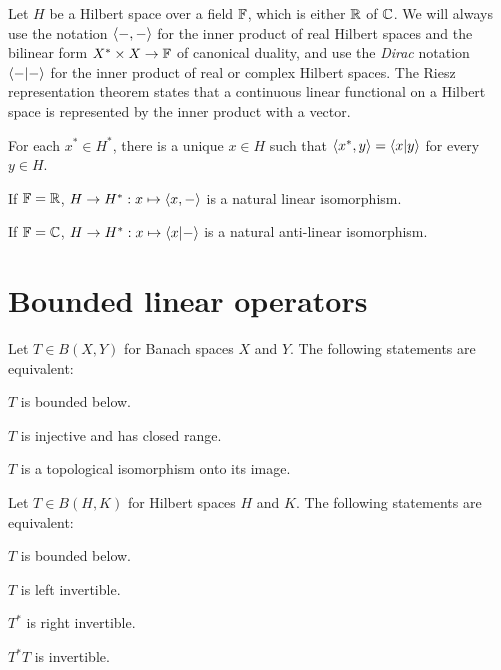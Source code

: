 \documentclass{../note}
\begin{document}
\begin{prb}
Let $H$ be a Hilbert space over a field $\mathbb{F}$, which is either $\mathbb{R}$ of $\mathbb{C}$.
We will always use the notation $\langle-,-\rangle$ for the inner product of real Hilbert spaces and the bilinear form $X^*\times X\to\mathbb{F}$ of canonical duality, and use the \emph{Dirac} notation $\langle-|-\rangle$ for the inner product of real or complex Hilbert spaces.
The Riesz representation theorem states that a continuous linear functional on a Hilbert space is represented by the inner product with a vector.
\begin{parts}
\item For each $x^*\in H^*$, there is a unique $x\in H$ such that $\langle x^*,y\rangle=\langle x|y\rangle$ for every $y\in H$.
\item If $\mathbb{F}=\mathbb{R}$, $H\to H^*:x\mapsto\langle x,-\rangle$ is a natural linear isomorphism.
\item If $\mathbb{F}=\mathbb{C}$, $H\to H^*:x\mapsto\langle x|-\rangle$ is a natural anti-linear isomorphism.
\end{parts}
\end{prb}



\section{Bounded linear operators}
\begin{prb}
Let $T\in B(X,Y)$ for Banach spaces $X$ and $Y$.
The following statements are equivalent:
\begin{parts}
\item $T$ is bounded below.
\item $T$ is injective and has closed range.
\item $T$ is a topological isomorphism onto its image.
\end{parts}
\end{prb}

\begin{prb}
Let $T\in B(H,K)$ for Hilbert spaces $H$ and $K$.
The following statements are equivalent:
\begin{parts}
\item $T$ is bounded below.
\item $T$ is left invertible.
\item $T^*$ is right invertible.
\item $T^*T$ is invertible.
\end{parts}
\end{prb}
\end{document}
